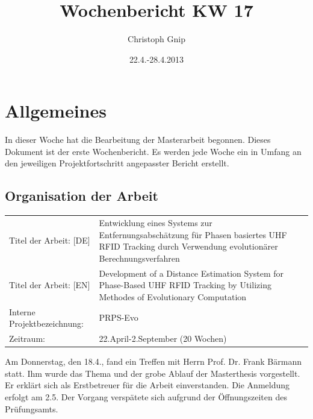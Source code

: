 \documentclass[a4paper,12pt,fleqn]{scrartcl}
\title{Wochenbericht KW 17}
\author{Christoph Gnip}
\date{ 22.4.-28.4.2013 }
\begin{document}
\setlength{\headheight}{36pt}

\begin{titlepage}

\maketitle

\thispagestyle{empty}



\end{titlepage}

\section[Allgemeines]{Allgemeines}
In dieser Woche hat die Bearbeitung der Masterarbeit begonnen. Dieses Dokument ist der erste Wochenbericht. Es werden jede Woche ein in Umfang an den jeweiligen Projektfortschritt angepasster Bericht erstellt.

\subsection{Organisation der Arbeit}
\begin{table}[right]
    \renewcommand{\arraystretch}{1.5}
    \begin{tabular}{lp{11cm}}
      Titel der Arbeit:  [DE] & Entwicklung eines Systems zur
Entfernungsabschätzung für Phasen basiertes UHF RFID Tracking durch Verwendung
evolutionärer Berechnungsverfahren \\
      Titel der Arbeit:  [EN] & Development of a Distance Estimation System for
Phase-Based UHF RFID Tracking by Utilizing Methodes of Evolutionary Computation
\\
      Interne Projektbezeichnung: & PRPS-Evo      \\
      Zeitraum: & 22.April-2.September (20 Wochen)
    \end{tabular}
\end{table}
%
Am Donnerstag, den 18.4., fand ein Treffen mit Herrn Prof. Dr. Frank Bärmann statt. Ihm wurde das Thema und der grobe Ablauf der Masterthesis vorgestellt.
Er erklärt sich als Erstbetreuer für die Arbeit einverstanden.
Die Anmeldung erfolgt am 2.5. Der Vorgang verspätete sich aufgrund der Öffnungszeiten des Prüfungsamts.
\end{document}
